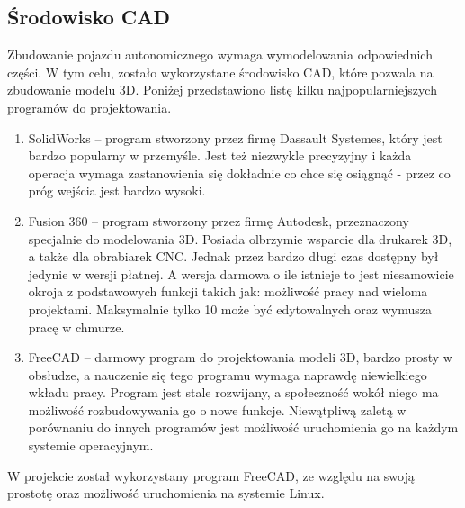     \subsection{Środowisko CAD}
        Zbudowanie pojazdu autonomicznego wymaga wymodelowania odpowiednich części.
        W tym celu, zostało wykorzystane środowisko CAD, które pozwala na zbudowanie modelu 3D.
        Poniżej przedstawiono listę kilku najpopularniejszych programów do projektowania.
        \begin{enumerate}
            \item SolidWorks -- program stworzony przez firmę Dassault Systemes, który jest bardzo popularny w przemyśle. Jest też niezwykle precyzyjny i każda operacja wymaga zastanowienia się dokładnie co chce się osiągnąć - przez co próg wejścia jest bardzo wysoki.
            \item Fusion 360 -- program stworzony przez firmę Autodesk, przeznaczony specjalnie do modelowania 3D. Posiada olbrzymie wsparcie dla drukarek 3D, a także dla obrabiarek CNC. 
                                Jednak przez bardzo długi czas dostępny był jedynie w wersji płatnej.
                                A wersja darmowa o ile istnieje to jest niesamowicie okroja z podstawowych funkcji takich jak: możliwość pracy nad wieloma projektami. 
                                Maksymalnie tylko 10 może być edytowalnych oraz wymusza pracę w chmurze.
            \item FreeCAD -- darmowy program do projektowania modeli 3D, bardzo prosty w obsłudze, a nauczenie się tego programu wymaga naprawdę niewielkiego wkładu pracy.
                             Program jest stale rozwijany, a społeczność wokół niego ma możliwość rozbudowywania go o nowe funkcje. Niewątpliwą zaletą w porównaniu do innych programów jest możliwość uruchomienia go na każdym systemie operacyjnym. 
        \end{enumerate}

        W projekcie został wykorzystany program FreeCAD, ze względu na swoją prostotę oraz możliwość uruchomienia na systemie Linux.

        